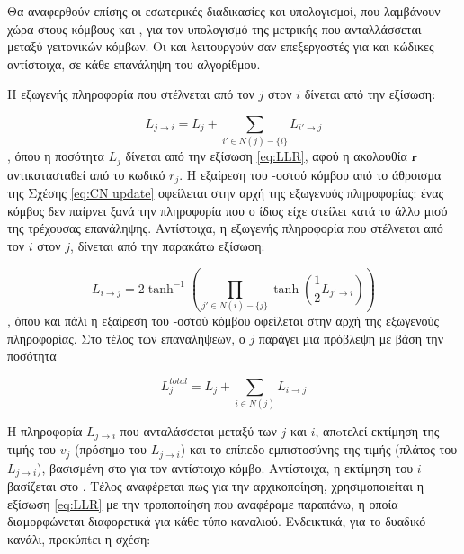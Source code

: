 Θα αναφερθούν επίσης οι εσωτερικές διαδικασίες και υπολογισμοί, που λαμβάνουν χώρα στους κόμβους  και , για τον υπολογισμό της μετρικής  που ανταλλάσσεται μεταξύ γειτονικών κόμβων. Oι  και  λειτουργούν σαν  επεξεργαστές για  και  κώδικες αντίστοιχα, σε κάθε επανάληψη του αλγορίθμου.

Η εξωγενής πληροφορία που στέλνεται από τον  $j$ στον  $i$ δίνεται από την εξίσωση:

\begin{equation}
L_{j\to i} = L_j + \sum_{i'\in N(j)-\lbrace i\rbrace} L_{i'\to j}
\label{eq:CN update}
\end{equation}
, όπου η ποσότητα $L_j$ δίνεται από την εξίσωση \ref{eq:LLR}, αφού η ακολουθία $\mathbf{r}$ αντικατασταθεί από το κωδικό  $r_j$. Η εξαίρεση του -οστού  κόμβου από το άθροισμα της Σχέσης \ref{eq:CN update} οφείλεται στην αρχή της εξωγενούς πληροφορίας: ένας κόμβος δεν παίρνει ξανά την πληροφορία που ο ίδιος είχε στείλει κατά το άλλο μισό της τρέχουσας επανάληψης. Αντίστοιχα, η εξωγενής πληροφορία που στέλνεται από τον  $i$ στον  $j$, δίνεται από την παρακάτω εξίσωση:

\begin{equation}
L_{i\to j} = 2\tanh^{-1} \left( \prod_{j'\in N(i)-\lbrace j\rbrace} \tanh \left( \frac{1}{2}L_{j'\to i} \right)\right)
\label{eq:VN update}
\end{equation}
, όπου και πάλι η εξαίρεση του -οστού  κόμβου οφείλεται στην αρχή της εξωγενούς πληροφορίας. Στο τέλος των επαναλήψεων, ο  $j$ παράγει μια πρόβλεψη με βάση την ποσότητα

\begin{equation}
L_{j}^{total} = L_j + \sum_{i\in N(j)} L_{i\to j}
\label{eq:LLR total}
\end{equation}

Η πληροφορία $L_{j\to i}$ που ανταλάσσεται μεταξύ των  $j$ και  $i$, απoτελεί εκτίμηση της τιμής του $v_j$ (πρόσημο του $L_{j\to i}$) και το επίπεδο εμπιστοσύνης της τιμής (πλάτος του $L_{j\to i}$), βασισμένη στο  για τον αντίστοιχο κόμβο. Αντίστοιχα, η εκτίμηση του  $i$ βασίζεται στο . Τέλος αναφέρεται πως για την αρχικοποίηση, χρησιμοποιείται η εξίσωση \ref{eq:LLR} με την τροποποίηση που αναφέραμε παραπάνω, η οποία διαμορφώνεται διαφορετικά για κάθε τύπο καναλιού. Ενδεικτικά, για το δυαδικό  κανάλι, προκύπtει η σχέση:

